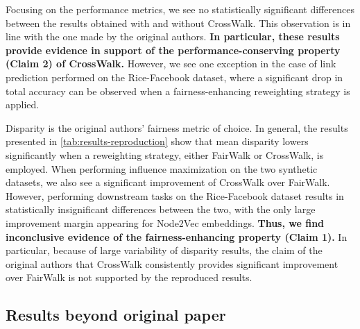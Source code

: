 Focusing on the performance metrics, we see no statistically significant differences between the results obtained with and without CrossWalk. This observation is in line with the one made by the original authors. \textbf{In particular, these results provide evidence in support of the performance-conserving property (Claim 2) of CrossWalk.} However, we see one exception in the case of link prediction performed on the Rice-Facebook dataset, where a significant drop in total accuracy can be observed when a fairness-enhancing reweighting strategy is applied.

Disparity is the original authors' fairness metric of choice. In general, the results presented in \autoref{tab:results-reproduction} show that mean disparity lowers significantly when a reweighting strategy, either FairWalk or CrossWalk, is employed. When performing influence maximization on the two synthetic datasets, we also see a significant improvement of CrossWalk over FairWalk. However, performing downstream tasks on the Rice-Facebook dataset results in statistically insignificant differences between the two, with the only large improvement margin appearing for Node2Vec embeddings. \textbf{Thus, we find inconclusive evidence of the fairness-enhancing property (Claim 1).} In particular, because of large variability of disparity results, the claim of the original authors that CrossWalk consistently provides significant improvement over FairWalk is not supported by the reproduced results.

\subsection{Results beyond original paper}
\label{subsec:sweep}


